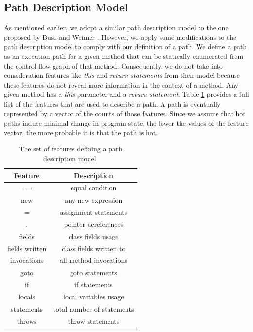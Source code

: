 \documentclass[10pt,twocolumn,letterpaper]{article}
\begin{document}
\subsection{Path Description Model}
As mentioned earlier, we adopt a similar path description model to the one proposed by Buse and Weimer \cite{buse2009road}. However, we apply some modifications
to the path description model to comply with our definition of a path. We define a path as an execution path for a given method that can be statically
enumerated from the control flow graph of that method. Consequently, we do not take into consideration features like \textit{this} and \textit{return
statements} from their model \cite{buse2009road} because these features do not reveal more information in the context of a method. Any given method has a
\textit{this} parameter and a \textit{return statement}. Table \ref{tab:features} provides a full list of the features that are used to describe a path. A
path is eventually represented by a vector of the counts of those features. Since we assume that hot paths induce minimal change in program state, the lower the
values of the feature vector, the more probable it is that the path is hot.

\begin{table}[h!]
\centering
\begin{tabular}{|c|c|}
\hline
\textbf{Feature} & \textbf{Description}\\
\hline\hline
== & equal condition \\
\hline
new & any new expression \\
\hline
= & assignment statements \\
\hline
. & pointer dereferences \\
\hline
fields & class fields usage  \\
\hline
fields written & class fields written to \\
\hline
invocations & all method invocations \\
\hline
goto & goto statements \\
\hline
if & if statements \\
\hline
locals & local variables usage \\
\hline
statements & total number of statements \\
\hline
throws & throw statements \\
\hline
\end{tabular}
\centering
\caption{The set of features defining a path description model.}
\label{tab:features}
\end{table}
\end{document}
